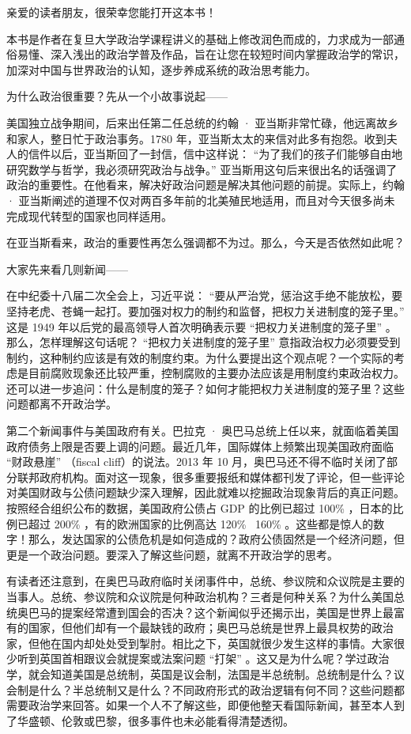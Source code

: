 
亲爱的读者朋友，很荣幸您能打开这本书！

本书是作者在复旦大学政治学课程讲义的基础上修改润色而成的，力求成为一部通俗易懂、深入浅出的政治学普及作品，旨在让您在较短时间内掌握政治学的常识，加深对中国与世界政治的认知，逐步养成系统的政治思考能力。

为什么政治很重要？先从一个小故事说起——

美国独立战争期间，后来出任第二任总统的约翰 · 亚当斯非常忙碌，他远离故乡和家人，整日忙于政治事务。1780 年，亚当斯太太的来信对此多有抱怨。收到夫人的信件以后，亚当斯回了一封信，信中这样说： “为了我们的孩子们能够自由地研究数学与哲学，我必须研究政治与战争。” 亚当斯用这句后来很出名的话强调了政治的重要性。在他看来，解决好政治问题是解决其他问题的前提。实际上，约翰 · 亚当斯阐述的道理不仅对两百多年前的北美殖民地适用，而且对今天很多尚未完成现代转型的国家也同样适用。

在亚当斯看来，政治的重要性再怎么强调都不为过。那么，今天是否依然如此呢？

大家先来看几则新闻——

在中纪委十八届二次全会上，习近平说： “要从严治党，惩治这手绝不能放松，要坚持老虎、苍蝇一起打。要加强对权力的制约和监督，把权力关进制度的笼子里。” 这是 1949 年以后党的最高领导人首次明确表示要 “把权力关进制度的笼子里” 。那么，怎样理解这句话呢？ “把权力关进制度的笼子里” 意指政治权力必须要受到制约，这种制约应该是有效的制度约束。为什么要提出这个观点呢？一个实际的考虑是目前腐败现象还比较严重，控制腐败的主要办法应该是用制度约束政治权力。还可以进一步追问：什么是制度的笼子？如何才能把权力关进制度的笼子里？这些问题都离不开政治学。

第二个新闻事件与美国政府有关。巴拉克 · 奥巴马总统上任以来，就面临着美国政府债务上限是否要上调的问题。最近几年，国际媒体上频繁出现美国政府面临 “财政悬崖” （fiscal cliff）的说法。2013 年 10 月，奥巴马还不得不临时关闭了部分联邦政府机构。面对这一现象，很多重要报纸和媒体都刊发了评论，但一些评论对美国财政与公债问题缺少深入理解，因此就难以挖掘政治现象背后的真正问题。按照经合组织公布的数据，美国政府公债占 GDP 的比例已超过 100\% ，日本的比例已超过 200\% ，有的欧洲国家的比例高达 120\% ~160\% 。这些都是惊人的数字！那么，发达国家的公债危机是如何造成的？政府公债固然是一个经济问题，但更是一个政治问题。要深入了解这些问题，就离不开政治学的思考。

有读者还注意到，在奥巴马政府临时关闭事件中，总统、参议院和众议院是主要的当事人。总统、参议院和众议院是何种政治机构？三者是何种关系？为什么美国总统奥巴马的提案经常遭到国会的否决？这个新闻似乎还揭示出，美国是世界上最富有的国家，但他们却有一个最缺钱的政府；奥巴马总统是世界上最具权势的政治家，但他在国内却处处受到掣肘。相比之下，英国就很少发生这样的事情。大家很少听到英国首相跟议会就提案或法案问题 “打架” 。这又是为什么呢？学过政治学，就会知道美国是总统制，英国是议会制，法国是半总统制。总统制是什么？议会制是什么？半总统制又是什么？不同政府形式的政治逻辑有何不同？这些问题都需要政治学来回答。如果一个人不了解这些，即便他整天看国际新闻，甚至本人到了华盛顿、伦敦或巴黎，很多事件也未必能看得清楚透彻。

